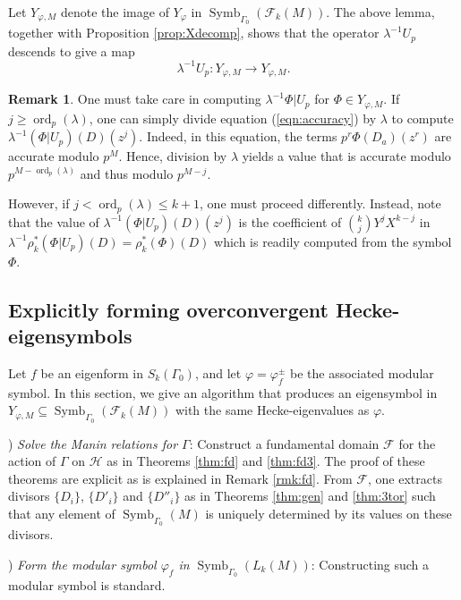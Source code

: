 \documentclass{amsart}
\theoremstyle{plain}
\theoremstyle{definition}
\newtheorem{remark}[thm]{Remark}
\newcommand{\F}{{\mathcal F}}
\renewcommand{\H}{\mathcal H}
\newcommand{\maps}{\rightarrow}
\renewcommand{\binom}[2]{\genfrac{(}{)}{0pt}{}{#1}{#2}}
\renewcommand{\sp}{{\rho^*_k}}
\newcommand{\FkM}{\F_k(M)}
\DeclareMathOperator{\ord}{ord}
\DeclareMathOperator{\Symb}{Symb}
\newcommand{\MSo}[1]{\Symb_{\Gamma_0}(#1)}
\begin{document}
Let $Y_{\varphi,M}$ denote the image of $Y_\varphi$ in $\MSo{\FkM}$.  The above lemma, together with Proposition \ref{prop:Xdecomp}, shows that the operator $\lambda^{-1} U_p$ descends to give a map
$$
\lambda^{-1}U_p : Y_{\varphi,M} \maps Y_{\varphi,M}.
$$

\begin{remark}
\label{rmk:iter}
One must take care in computing $\lambda^{-1} \Phi \big| U_p$ for $\Phi \in Y_{\varphi,M}$. If $j \geq \ord_p(\lambda)$, one can simply divide equation (\ref{eqn:accuracy}) by $\lambda$ to compute  $\lambda^{-1} (\Phi \big| U_p)(D)(z^j)$.  Indeed, in this equation, the terms $p^r \Phi(D_a)(z^r)$ are accurate modulo $p^M$.  Hence, division by $\lambda$ yields a value that is accurate modulo $p^{M-\ord_p(\lambda)}$ and thus modulo $p^{M-j}$.  

However, if $j < \ord_p(\lambda) \leq k+1$, one must proceed differently.  Instead, note that the value of $\lambda^{-1} (\Phi \big| U_p)(D)(z^j)$ is the coefficient of $\binom{k}{j} Y^j X^{k-j}$ in $\lambda^{-1} \sp(\Phi \big| U_p)(D) = \sp(\Phi)(D)$ which is readily computed from the symbol $\Phi$.
\end{remark}


\subsection{Explicitly forming overconvergent Hecke-eigensymbols}  

Let $f$ be an eigenform in $S_k(\Gamma_0)$, and let $\varphi = \varphi_f^\pm$ be the associated modular symbol.  In this section, we give an algorithm that produces an eigensymbol in $Y_{\varphi,M} \subseteq \MSo{\FkM}$ with the same Hecke-eigenvalues as $\varphi$.

\vspace{.2cm}

) {\it Solve the Manin relations for $\Gamma$}:  Construct a fundamental domain $\F$ for the action of $\Gamma$ on $\H$ as in Theorems \ref{thm:fd} and \ref{thm:fd3}.  The proof of these theorems are explicit as is explained in Remark \ref{rmk:fd}.  From $\F$, one extracts divisors $\{ D_i \}$, $\{ D'_i \}$ and $\{ D''_i \}$ as in Theorems \ref{thm:gen} and \ref{thm:3tor} such that any element of $\MSo{M}$ is uniquely determined by its values on these divisors.

\vspace{.2cm}

) {\it Form the modular symbol $\varphi_f$ in $\MSo{L_k(M)}$}: Constructing such a modular symbol is standard.  
\end{document}
